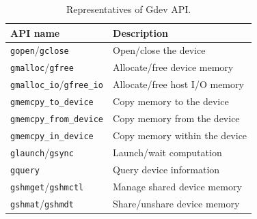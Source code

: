\begin{table}[t]
 \caption{Representatives of Gdev API.}
 \vspace{-0.5em}
 \label{tab:gdev_api}
 \begin{center}
  {\footnotesize
  \begin{tabular}{|l|l|}
   \hline
   \textbf{API name} & \textbf{Description}\\
   \hline
   \texttt{gopen}/\texttt{gclose} & Open/close the device\\
   \hline
   \texttt{gmalloc}/\texttt{gfree} & Allocate/free device memory\\
   \hline
   \texttt{gmalloc\_io}/\texttt{gfree\_io} & Allocate/free host I/O memory\\
   \hline
   \texttt{gmemcpy\_to\_device} & Copy memory to the device\\
   \hline
   \texttt{gmemcpy\_from\_device} & Copy memory from the device\\
   \hline
   \texttt{gmemcpy\_in\_device} & Copy memory within the device\\
   \hline
   \texttt{glaunch}/\texttt{gsync} & Launch/wait computation\\
   \hline
   \texttt{gquery} & Query device information\\
   \hline
   \texttt{gshmget}/\texttt{gshmctl} & Manage shared device memory\\
   \hline
   \texttt{gshmat}/\texttt{gshmdt} & Share/unshare device memory\\
   \hline
  \end{tabular}
  }
 \end{center}
\vspace{-1.5em}
\end{table}
